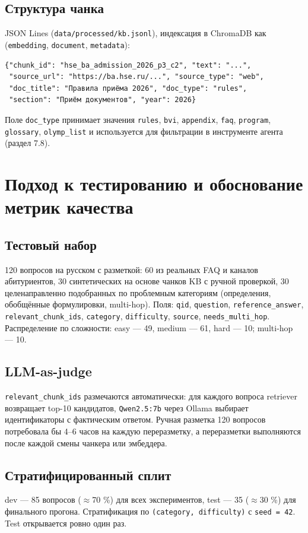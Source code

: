 \documentclass[a4paper,12pt]{extarticle}
\begin{document}
\subsection{Структура чанка}
JSON Lines (\texttt{data/processed/kb.jsonl}), индексация в ChromaDB как (\texttt{embedding}, \texttt{document}, \texttt{metadata}):

\begin{verbatim}
{"chunk_id": "hse_ba_admission_2026_p3_c2", "text": "...",
 "source_url": "https://ba.hse.ru/...", "source_type": "web",
 "doc_title": "Правила приёма 2026", "doc_type": "rules",
 "section": "Приём документов", "year": 2026}
\end{verbatim}

Поле \texttt{doc\_type} принимает значения \texttt{rules}, \texttt{bvi}, \texttt{appendix}, \texttt{faq}, \texttt{program}, \texttt{glossary}, \texttt{olymp\_list} и используется для фильтрации в инструменте агента (раздел 7.8).

\section{Подход к тестированию и обоснование метрик качества}

\subsection{Тестовый набор}
120 вопросов на русском с разметкой: 60 из реальных FAQ и каналов абитуриентов, 30 синтетических на основе чанков KB с ручной проверкой, 30 целенаправленно подобранных по проблемным категориям (определения, обобщённые формулировки, multi-hop). Поля: \texttt{qid}, \texttt{question}, \texttt{reference\_answer}, \texttt{relevant\_chunk\_ids}, \texttt{category}, \texttt{difficulty}, \texttt{source}, \texttt{needs\_multi\_hop}. Распределение по сложности: easy --- 49, medium --- 61, hard --- 10; multi-hop --- 10.

\subsection{LLM-as-judge}
\texttt{relevant\_chunk\_ids} размечаются автоматически: для каждого вопроса retriever возвращает top-10 кандидатов, \texttt{Qwen2.5:7b} через Ollama выбирает идентификаторы с фактическим ответом. Ручная разметка 120 вопросов потребовала бы 4--6 часов на каждую переразметку, а переразметки выполняются после каждой смены чанкера или эмбеддера.

\subsection{Стратифицированный сплит}
dev --- 85 вопросов ($\approx$70 \%) для всех экспериментов, test --- 35 ($\approx$30 \%) для финального прогона. Стратификация по \texttt{(category, difficulty)} с \texttt{seed = 42}. Test открывается ровно один раз.
\end{document}
